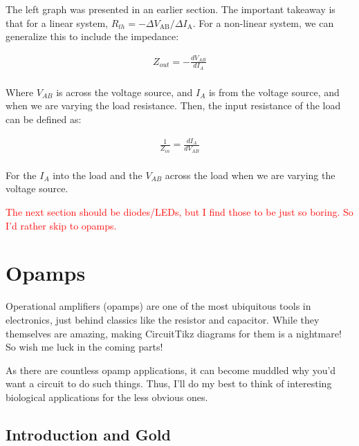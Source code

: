 \documentclass[12pt]{report}
\begin{document}
The left graph was presented in an earlier section. The important takeaway is that for a linear system, $R_{th} = -\Delta V_{\mathrm{AB}}/\Delta I_{\mathrm{A}}$. For a non-linear system, we can generalize this to include the impedance: 


\begin{equation} \label{out}
\begin{split}
Z_{out} = -\frac{dV_{AB}}{dI_A}\\
\end{split}
\end{equation}

Where $V_{AB}$ is across the voltage source, and $I_A$ is from the voltage source, and when we are varying the load resistance. Then, the input resistance of the load can be defined as: 


\begin{equation} \label{in}
\begin{split}
\frac{1}{Z_{in}} = \frac{dI_{A}}{dV_{AB}}\\
\end{split}
\end{equation}

For the $I_A$ into the load and the $V_{AB}$ across the load when we are varying the voltage source. 


\textcolor{red}{The next section should be diodes/LEDs, but I find those to be just so boring. So I'd rather skip to opamps.}

\vfill

\chapter{Opamps}

Operational amplifiers (opamps) are one of the most ubiquitous tools in electronics, just behind classics like the resistor and capacitor. While they themselves are amazing, making CircuitTikz diagrams for them is a nightmare! So wish me luck in the coming parts!\newline

As there are countless opamp applications, it can become muddled why you'd want a circuit to do such things. Thus, I'll do my best to think of interesting biological applications for the less obvious ones. 

\section{Introduction and Gold}
\end{document}
